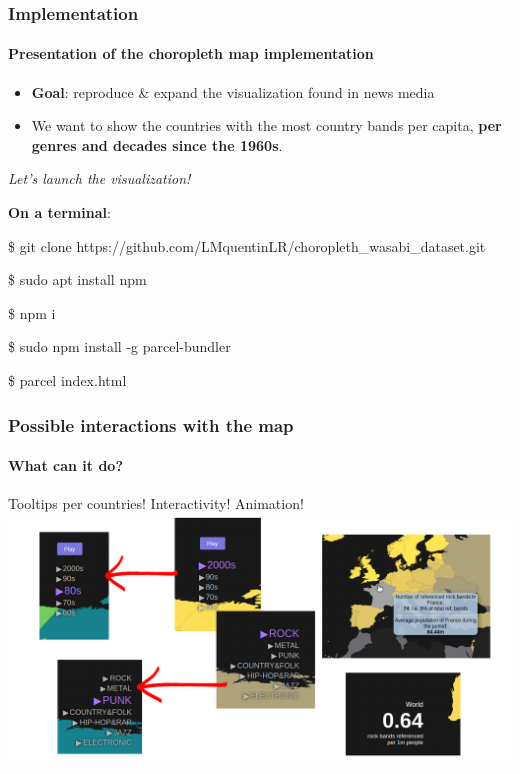 \documentclass[aspectratio=43,10pt]{beamer}
\begin{document}
\begin{frame}
    \frametitle{Implementation}
    \framesubtitle{Presentation of the choropleth map implementation}
    \begin{itemize}
        \item \textbf{Goal}: reproduce \& expand the visualization found in news media
        \item We want to show the countries with the most country bands per capita, \textbf{per genres and decades since the 1960s}.
    \end{itemize}
    \newline
    \newline
    \begin{center}
       \textit{Let's launch the visualization!}
    \end{center}
    \newline
    \newline
    \textbf{On a terminal}:
    \newline
    \newline
    \small{
    \$ git clone https://github.com/LMquentinLR/choropleth\_wasabi\_dataset.git
    
    
    \$ sudo apt install npm
    
    
    \$ npm i
    
    
    \$ sudo npm install -g parcel-bundler
    
    
    \$ parcel index.html}
\end{frame}

\begin{frame}
    \frametitle{Possible interactions with the map}
    \framesubtitle{What can it do?}
    Tooltips per countries! Interactivity! Animation!
    \newline\newline
    \includegraphics[width=1\linewidth]{imagens/interactions.png}
\end{frame}
\end{document}

